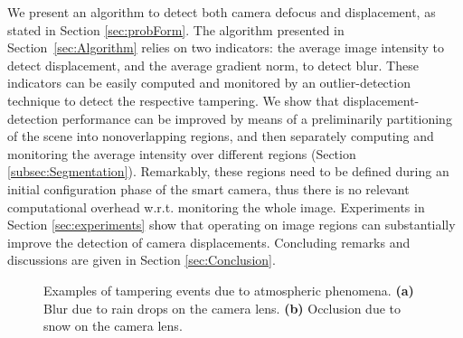 \documentclass{llncs}
\begin{document}
We present an algorithm to detect both camera defocus and displacement, as stated in Section \ref{sec:probForm}. The algorithm presented in Section~\ref{sec:Algorithm} relies on two indicators: the average image intensity to detect displacement, and the average gradient norm, to detect blur. These indicators can be easily computed and monitored by an outlier-detection technique to detect the respective tampering. We show that displacement-detection performance can be improved by means of a preliminarily partitioning of the scene into nonoverlapping regions, and then separately computing and monitoring the average intensity over different regions (Section \ref{subsec:Segmentation}). Remarkably, these regions need to be defined during an initial configuration phase of the smart camera, thus there is no relevant computational overhead w.r.t. monitoring the whole image. Experiments in Section \ref{sec:experiments} show that operating on image regions can substantially improve the detection of camera displacements. Concluding remarks and discussions are given in Section \ref{sec:Conclusion}.

\begin{figure}[t!]
\centering
{}
\caption[Tampering examples]{Examples of tampering events due to atmospheric phenomena. \textbf{(a)} Blur due to rain drops on the camera lens. \textbf{(b)} Occlusion due to snow on the camera lens.}
\label{fig:tampering}
\end{figure}
\end{document}
